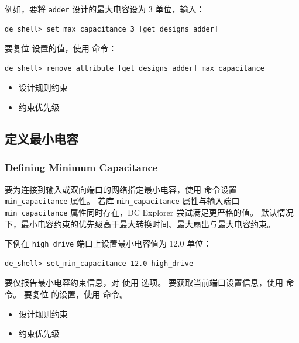 例如，要将 \texttt{adder} 设计的最大电容设为 3 单位，输入：
\begin{lstlisting}
de_shell> set_max_capacitance 3 [get_designs adder]
\end{lstlisting}

要复位  设置的值，使用  命令：
\begin{lstlisting}
de_shell> remove_attribute [get_designs adder] max_capacitance
\end{lstlisting}

\begin{seeAlsoBox}
\begin{itemize}
  \item 设计规则约束
  \item 约束优先级
\end{itemize}
\end{seeAlsoBox}

\subsection{定义最小电容}
\subsubsection*{Defining Minimum Capacitance}

要为连接到输入或双向端口的网络指定最小电容，使用  命令设置 \texttt{min\_capacitance} 属性。
若库 \texttt{min\_capacitance} 属性与输入端口 \texttt{min\_capacitance} 属性同时存在，DC Explorer 尝试满足更严格的值。
默认情况下，最小电容约束的优先级高于最大转换时间、最大扇出与最大电容约束。

下例在 \texttt{high\_drive} 端口上设置最小电容值为 12.0 单位：
\begin{lstlisting}
de_shell> set_min_capacitance 12.0 high_drive
\end{lstlisting}

要仅报告最小电容约束信息，对  使用  选项。
要获取当前端口设置信息，使用  命令。
要复位  的设置，使用  命令。

\begin{seeAlsoBox}
\begin{itemize}
  \item 设计规则约束
  \item 约束优先级
\end{itemize}
\end{seeAlsoBox}

